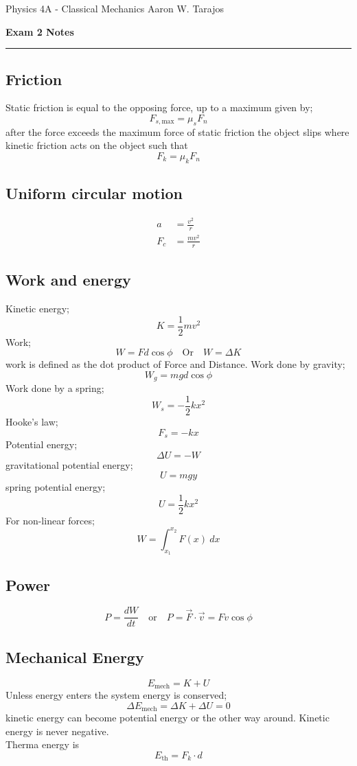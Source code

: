 \documentclass{article}
\begin{document}
\noindent
Physics 4A - Classical Mechanics \hfill Aaron W. Tarajos
\begin{center}
	\textbf{Exam 2 Notes}
\end{center}

\noindent\rule{\textwidth}{0.4pt}

\begin{multicols}{2}
\subsection*{Friction}
Static friction is equal to the opposing force, up to a maximum given by;
\[
	F_{s,\text{max}} = \mu_s F_n
\]
after the force exceeds the maximum force of static friction the object slips where kinetic friction acts on the object such that
\[
	F_k = \mu_k F_n
\]

\subsection*{Uniform circular motion}
\begin{align*}
	a &= \frac{v^2}{r} \\
	F_c &= \frac{mv^2}{r}
\end{align*}

\subsection*{Work and energy}
Kinetic energy;
\[
	K = \frac{1}{2}mv^2
\]
Work;
\[
	W = Fd \cos \phi \quad \text{Or} \quad W = \Delta K
\]
work is defined as the dot product of Force and Distance. Work done by gravity;
\[
	W_g = mgd \cos \phi
\]
Work done by a spring;
\[
	W_s = -\frac{1}{2}kx^2
\]
Hooke's law;
\[
	F_s = -kx
\]
Potential energy;
\[
	\Delta U = -W
\]
gravitational potential energy;
\[
	U = mgy
\]
spring potential energy;
\[
	U = \frac{1}{2}kx^2
\]
For non-linear forces;
\[
	W = \int_{x_1}^{x_2} F(x)\ dx
\]

\subsection*{Power}
\[
	P = \frac{dW}{dt} \quad \text{or} \quad P = \vec{F} \cdot \vec{v} = Fv \cos \phi
\]

\subsection*{Mechanical Energy}
\[
	E_\text{mech} = K + U
\]
Unless energy enters the system energy is conserved;
\[
	\Delta E_\text{mech} = \Delta K + \Delta U = 0
\]
kinetic energy can become potential energy or the other way around. Kinetic energy is never negative.\\
Therma energy is
\[
	E_\text{th} = F_k \cdot d
\]


\end{multicols}
\end{document}
